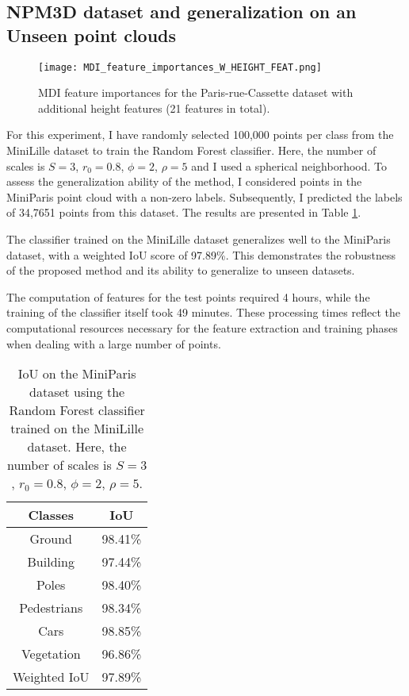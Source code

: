 \documentclass{article}
\begin{document}
\subsection{NPM3D dataset and generalization on an Unseen point clouds}\label{sec:generalization}

\begin{figure}
    \hspace*{-2cm}
        \texttt{[image: MDI\_feature\_importances\_W\_HEIGHT\_FEAT.png]}
    \caption{MDI feature importances for the Paris-rue-Cassette dataset with additional height features (21 features in total).}
    \label{fig:MDI_height}
\end{figure}

For this experiment, I have randomly selected 100,000 points per class from the MiniLille dataset to train the Random Forest classifier. Here, the number of scales is $S=3$, $r_0=0.8$, $\phi=2$, $\rho=5$ and I used a spherical neighborhood. To assess the generalization ability of the method, I considered points in the MiniParis point cloud with a non-zero labels. Subsequently, I predicted the labels of 34,7651 points from this dataset. The results are presented in Table \ref{tab:results_generalization}. 

The classifier trained on the MiniLille dataset generalizes well to the MiniParis dataset, with a weighted IoU score of 97.89\%. This demonstrates the robustness of the proposed method and its ability to generalize to unseen datasets. 

The computation of features for the test points required 4 hours, while the training of the classifier itself took 49 minutes. These processing times reflect the computational resources necessary for the feature extraction and training phases when dealing with a large number of points.


\begin{table}[H]
    \centering
\begin{tabular}{cc}
    Classes & IoU \\
    \hline\hline
    Ground & 98.41\% \\
    Building & 97.44\% \\
    Poles & 98.40\% \\
    Pedestrians & 98.34\% \\
    Cars & 98.85\% \\
    Vegetation & 96.86\% \\
    \hline 
    Weighted IoU & 97.89\% \\
\end{tabular}
\caption{IoU on the MiniParis dataset using the Random Forest classifier trained on the MiniLille dataset. Here, the number of scales is $S=3$, $r_0=0.8$, $\phi=2$, $\rho=5$.}
\label{tab:results_generalization}
\end{table}
\end{document}
